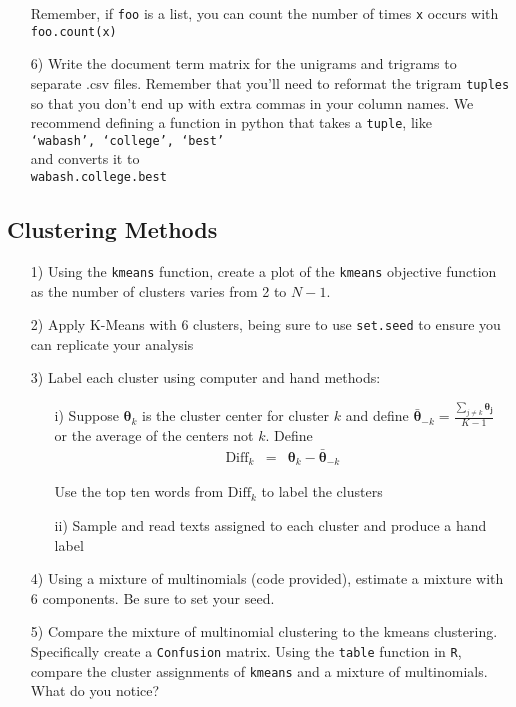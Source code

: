 \documentclass[12pt,letterpaper]{article}
\begin{document}
\begin{itemize}
Remember, if {\tt foo} is a list, you can count the number of times {\tt x} occurs with \\
{\tt foo.count(x)}

\item[6)] Write the document term matrix for the unigrams and trigrams to separate .csv files.  Remember that you'll need to reformat the trigram {\tt tuples} so that you don't end up with extra commas in your column names. We recommend defining a function in python that takes a {\tt tuple}, like \\
{\tt `wabash', `college', `best'} \\
and converts it to\\
{\tt wabash.college.best}
\end{itemize}



\subsection*{Clustering Methods}

\begin{itemize}
\item[1)] Using the {\tt kmeans} function, create a plot of the {\tt kmeans} objective function as the number of clusters varies from 2 to $N - 1$.    
\item[2)] Apply K-Means with 6 clusters, being sure to use {\tt set.seed} to ensure you can replicate your analysis
\item[3)] Label each cluster using computer and hand methods:
\begin{itemize}
\item[i)] Suppose $\boldsymbol{\theta}_{k}$ is the cluster center for cluster $k$ and define $\bar{\boldsymbol{\theta}}_{-k} = \frac{\sum_{j \neq k} \boldsymbol{\theta_{j}}   }{K-1 }$ or the average of the centers not $k$.  Define 
\begin{eqnarray}
\text{Diff}_{k} & = & \boldsymbol{\theta}_{k} - \bar{\boldsymbol{\theta}}_{-k}\nonumber 
\end{eqnarray}

Use the top ten words from $\text{Diff}_{k}$ to label the clusters
\item[ii)] Sample and read texts assigned to each cluster and produce a hand label
\end{itemize}
\item[4)] Using a mixture of multinomials (code provided), estimate a mixture with 6 components.  Be sure to set your seed.  
\item[5)] Compare the mixture of multinomial clustering to the kmeans clustering.  Specifically create a {\tt Confusion} matrix.  Using the {\tt table} function in {\tt R}, compare the cluster assignments  of {\tt kmeans} and a mixture of multinomials. What do you notice?    
\end{itemize}
\end{document}
